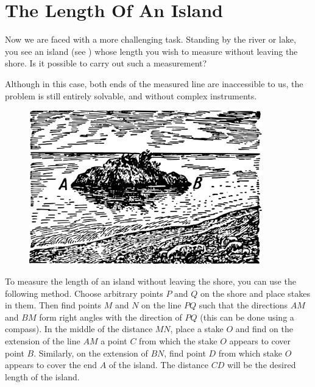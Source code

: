 \section{The Length Of An Island}

\ques Now we are faced with a more challenging task. Standing by the river or lake, you see an island (see ) whose length you wish to measure without leaving the shore. Is it possible to carry out such a measurement?

Although in this case, both ends of the measured line are inaccessible to us, the problem is still entirely solvable, and without complex instruments.

\begin{figure}[h!]
\centering
\includegraphics[width=0.9\textwidth]{figures/ch-02/fig-034.pdf}
\end{figure}


\ans To measure the length of an island without leaving the shore, you can use the following method. Choose arbitrary points $P$ and $Q$ on the shore and place stakes in them. Then find points $M$ and $N$ on the line $PQ$ such that the directions $AM$ and $BM$ form right angles with the direction of $PQ$ (this can be done using a compass). In the middle of the distance $MN$, place a stake $O$ and find on the extension of the line $AM$ a point $C$ from which the stake $O$ appears to cover point $B$. Similarly, on the extension of $BN$, find point $D$ from which stake $O$ appears to cover the end $A$ of the island. The distance $CD$ will be the desired length of the island.

